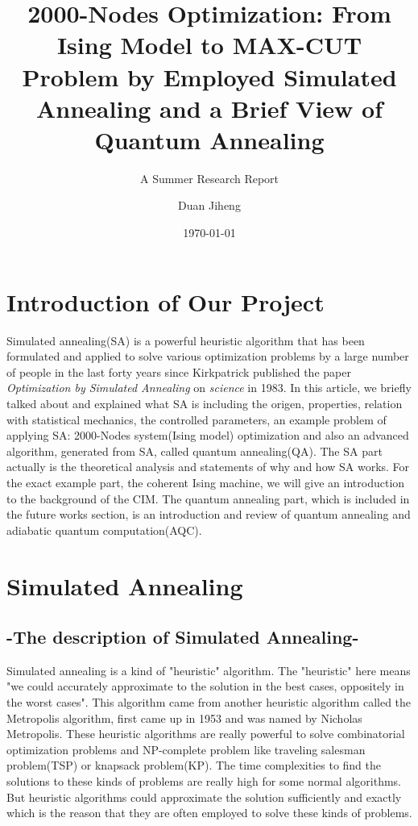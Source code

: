 \documentclass{turabian-researchpaper}
\title{2000-Nodes Optimization: From Ising Model to MAX-CUT Problem by Employed Simulated Annealing and a Brief View of Quantum Annealing}
\subtitle{A Summer Research Report}
\author{Duan Jiheng}
\date{\today}
\begin{document}
\maketitle

\section{Introduction of Our Project}
    Simulated annealing(SA) is a powerful heuristic algorithm that has been formulated and applied to solve various optimization problems by a large number of people in the last forty years since Kirkpatrick published the paper \textit{Optimization by Simulated Annealing} on \textit{science} in 1983. In this article, we briefly talked about and explained what SA is including the origen, properties, relation with statistical mechanics, the controlled parameters, an example problem of applying SA: 2000-Nodes system(Ising model) optimization and also an advanced algorithm, generated from SA, called quantum annealing(QA). The SA part actually is the theoretical analysis and statements of why and how SA works. For the exact example part, the coherent Ising machine, we will give an introduction to the background of the CIM. The quantum annealing part, which is included in the future works section, is an introduction and review of quantum annealing and adiabatic quantum computation(AQC).

\section{Simulated Annealing}

    \subsection{-The description of Simulated Annealing-}
        Simulated annealing is a kind of "heuristic" algorithm. The "heuristic" here means "we could accurately approximate to the solution in the best cases, oppositely in the worst cases". This algorithm came from another heuristic algorithm called the Metropolis algorithm, first came up in 1953 and was named by Nicholas Metropolis. These heuristic algorithms are really powerful to solve combinatorial optimization problems and NP-complete problem\cite{cook2007overview} like traveling salesman problem(TSP) or knapsack problem(KP). The time complexities to find the solutions to these kinds of problems are really high for some normal algorithms. But heuristic algorithms could approximate the solution sufficiently and exactly which is the reason that they are often employed to solve these kinds of problems.
\end{document}
